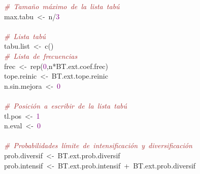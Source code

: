 \mbox{}\ \ \textit{\textcolor{Brown}{\#\ Tamaño\ máximo\ de\ la\ lista\ tabú}} \\
\mbox{}\ \ max\textcolor{BrickRed}{.}tabu\ \textcolor{BrickRed}{\textless{}-}\ n\textcolor{BrickRed}{/}\textcolor{Purple}{3} \\
\mbox{}\ \  \\
\mbox{}\ \ \textit{\textcolor{Brown}{\#\ Lista\ tabú}} \\
\mbox{}\ \ tabu\textcolor{BrickRed}{.}list\ \textcolor{BrickRed}{\textless{}-}\ c\textcolor{BrickRed}{()} \\
\mbox{}\ \ \textit{\textcolor{Brown}{\#\ Lista\ de\ frecuencias}} \\
\mbox{}\ \ frec\ \textcolor{BrickRed}{\textless{}-}\ rep\textcolor{BrickRed}{(}\textcolor{Purple}{0}\textcolor{BrickRed}{,}n\textcolor{BrickRed}{*}BT\textcolor{BrickRed}{.}ext\textcolor{BrickRed}{.}coef\textcolor{BrickRed}{.}frec\textcolor{BrickRed}{)} \\
\mbox{}\ \ tope\textcolor{BrickRed}{.}reinic\ \textcolor{BrickRed}{\textless{}-}\ BT\textcolor{BrickRed}{.}ext\textcolor{BrickRed}{.}tope\textcolor{BrickRed}{.}reinic \\
\mbox{}\ \ n\textcolor{BrickRed}{.}sin\textcolor{BrickRed}{.}mejora\ \textcolor{BrickRed}{\textless{}-}\ \textcolor{Purple}{0} \\
\mbox{}\ \  \\
\mbox{}\ \ \textit{\textcolor{Brown}{\#\ Posición\ a\ escribir\ de\ la\ lista\ tabú}} \\
\mbox{}\ \ tl\textcolor{BrickRed}{.}pos\ \textcolor{BrickRed}{\textless{}-}\ \textcolor{Purple}{1} \\
\mbox{}\ \ n\textcolor{BrickRed}{.}eval\ \textcolor{BrickRed}{\textless{}-}\ \textcolor{Purple}{0} \\
\mbox{}\ \  \\
\mbox{}\ \ \textit{\textcolor{Brown}{\#\ Probabilidades\ límite\ de\ intensificación\ y\ diversificación}} \\
\mbox{}\ \ prob\textcolor{BrickRed}{.}diversif\ \textcolor{BrickRed}{\textless{}-}\ BT\textcolor{BrickRed}{.}ext\textcolor{BrickRed}{.}prob\textcolor{BrickRed}{.}diversif \\
\mbox{}\ \ prob\textcolor{BrickRed}{.}intensif\ \textcolor{BrickRed}{\textless{}-}\ BT\textcolor{BrickRed}{.}ext\textcolor{BrickRed}{.}prob\textcolor{BrickRed}{.}intensif\ \textcolor{BrickRed}{+}\ BT\textcolor{BrickRed}{.}ext\textcolor{BrickRed}{.}prob\textcolor{BrickRed}{.}diversif \\
\mbox{}\ \  \\
